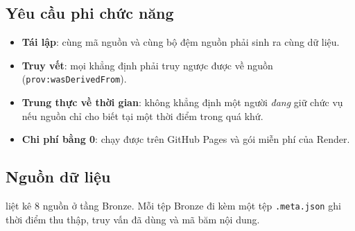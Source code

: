 \documentclass[12pt,a4paper]{article}
\begin{document}
\subsection{Yêu cầu phi chức năng}
\begin{itemize}
  \item \textbf{Tái lập}: cùng mã nguồn và cùng bộ đệm nguồn phải sinh ra cùng dữ liệu.
  \item \textbf{Truy vết}: mọi khẳng định phải truy ngược được về nguồn (\texttt{prov:wasDerivedFrom}).
  \item \textbf{Trung thực về thời gian}: không khẳng định một người \emph{đang} giữ chức vụ nếu nguồn chỉ cho biết
  tại một thời điểm trong quá khứ.
  \item \textbf{Chi phí bằng 0}: chạy được trên GitHub Pages và gói miễn phí của Render.
\end{itemize}

\subsection{Nguồn dữ liệu}
 liệt kê 8 nguồn ở tầng Bronze. Mỗi tệp Bronze đi kèm một tệp \texttt{.meta.json} ghi thời điểm
thu thập, truy vấn đã dùng và mã băm nội dung.
\end{document}
